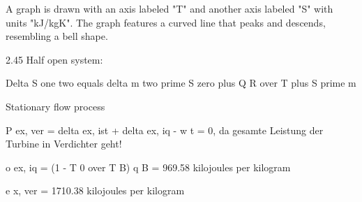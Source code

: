 A graph is drawn with an axis labeled "T" and another axis labeled "S" with units "kJ/kgK". The graph features a curved line that peaks and descends, resembling a bell shape.

2.45 Half open system:

Delta S one two equals delta m two prime S zero plus Q R over T plus S prime m

Stationary flow process

P ex, ver = delta ex, ist + delta ex, iq - w t = 0, da gesamte Leistung der Turbine in Verdichter geht!

o ex, iq = (1 - T 0 over T B) q B = 969.58 kilojoules per kilogram

e x, ver = 1710.38 kilojoules per kilogram